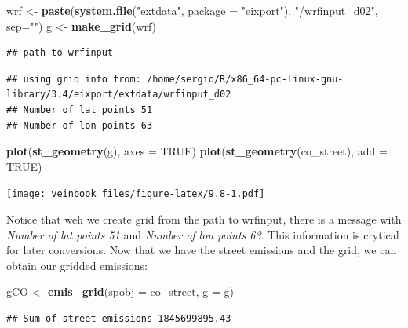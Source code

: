 \documentclass[12pt,graybox,envcountchap,sectrefs]{krantz}
\makeatletter
\newenvironment{Shaded}{\begin{snugshade}}{\end{snugshade}}
\newcommand{\KeywordTok}[1]{\textcolor[rgb]{0.13,0.29,0.53}{\textbf{#1}}}
\newcommand{\DataTypeTok}[1]{\textcolor[rgb]{0.13,0.29,0.53}{#1}}
\newcommand{\StringTok}[1]{\textcolor[rgb]{0.31,0.60,0.02}{#1}}
\newcommand{\OtherTok}[1]{\textcolor[rgb]{0.56,0.35,0.01}{#1}}
\newcommand{\NormalTok}[1]{#1}
\newenvironment{kframe}{%
\medskip{}
\setlength{\fboxsep}{.8em}
 \def\at@end@of@kframe{}%
 \ifinner\ifhmode%
  \def\at@end@of@kframe{\end{minipage}}%
  \begin{minipage}{\columnwidth}%
 \fi\fi%
 \def\FrameCommand##1{\hskip\@totalleftmargin \hskip-\fboxsep
 \colorbox{shadecolor}{##1}\hskip-\fboxsep
     \hskip-\linewidth \hskip-\@totalleftmargin \hskip\columnwidth}%
 \MakeFramed {\advance\hsize-\width
   \@totalleftmargin\z@ \linewidth\hsize
   \@setminipage}}%
 {\par\unskip\endMakeFramed%
 \at@end@of@kframe}
\renewenvironment{Shaded}{\begin{kframe}}{\end{kframe}}
\theoremstyle{definition}
\theoremstyle{definition}
\theoremstyle{definition}
\theoremstyle{remark}
\makeatother
\begin{document}
\begin{Shaded}
\begin{Highlighting}[]
\NormalTok{wrf <-}\StringTok{ }\KeywordTok{paste}\NormalTok{(}\KeywordTok{system.file}\NormalTok{(}\StringTok{"extdata"}\NormalTok{, }\DataTypeTok{package =} \StringTok{"eixport"}\NormalTok{),}
             \StringTok{"/wrfinput_d02"}\NormalTok{, }\DataTypeTok{sep=}\StringTok{""}\NormalTok{)}
\NormalTok{g  <-}\StringTok{ }\KeywordTok{make_grid}\NormalTok{(wrf)}
\end{Highlighting}
\end{Shaded}

\begin{verbatim}
## path to wrfinput
\end{verbatim}

\begin{verbatim}
## using grid info from: /home/sergio/R/x86_64-pc-linux-gnu-library/3.4/eixport/extdata/wrfinput_d02 
## Number of lat points 51
## Number of lon points 63
\end{verbatim}

\begin{Shaded}
\begin{Highlighting}[]
\KeywordTok{plot}\NormalTok{(}\KeywordTok{st_geometry}\NormalTok{(g), }\DataTypeTok{axes =} \OtherTok{TRUE}\NormalTok{)}
\KeywordTok{plot}\NormalTok{(}\KeywordTok{st_geometry}\NormalTok{(co_street), }\DataTypeTok{add =} \OtherTok{TRUE}\NormalTok{)}
\end{Highlighting}
\end{Shaded}

\texttt{[image: veinbook\_files/figure-latex/9.8-1.pdf]}

Notice that weh we create grid from the path to wrfinput, there is a
message with \emph{Number of lat points 51} and \emph{Number of lon
points 63}. This information is crytical for later conversions. Now that
we have the street emissions and the grid, we can obtain our gridded
emissions:

\begin{Shaded}
\begin{Highlighting}[]
\NormalTok{gCO <-}\StringTok{ }\KeywordTok{emis_grid}\NormalTok{(}\DataTypeTok{spobj =}\NormalTok{ co_street, }\DataTypeTok{g =}\NormalTok{ g)}
\end{Highlighting}
\end{Shaded}

\begin{verbatim}
## Sum of street emissions 1845699895.43
\end{verbatim}
\end{document}
